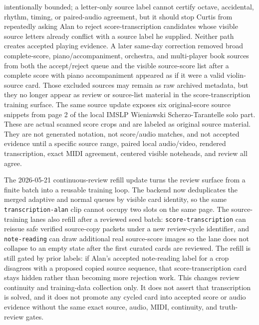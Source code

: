 \documentclass[12pt,letterpaper]{article}
\begin{document}
intentionally bounded; a letter-only source label cannot certify octave, accidental, rhythm, timing, or paired-audio agreement, but it should stop Curtis from repeatedly asking Alan to reject score-transcription candidates whose visible source letters already conflict with a source label he supplied. Neither path creates accepted playing evidence. A later same-day correction removed broad complete-score, piano/accompaniment, orchestra, and multi-player book sources from both the accept/reject queue and the visible source-score list after a complete score with piano accompaniment appeared as if it were a valid violin-source card. Those excluded sources may remain as raw archived metadata, but they no longer appear as review or source-list material in the score-transcription training surface. The same source update exposes six original-score source snippets from page 2 of the local IMSLP Wieniawski Scherzo-Tarantelle solo part. These are actual scanned score crops and are labeled as original source material. They are not generated notation, not score/audio matches, and not accepted evidence until a specific source range, paired local audio/video, rendered transcription, exact MIDI agreement, centered visible noteheads, and review all agree.

The 2026-05-21 continuous-review refill update turns the review surface from a finite batch into a reusable training loop. The backend now deduplicates the merged adaptive and normal queues by visible card identity, so the same \texttt{transcription-alan} clip cannot occupy two slots on the same page. The source-training lanes also refill after a reviewed seed batch: \texttt{score-transcription} can reissue safe verified source-copy packets under a new review-cycle identifier, and \texttt{note-reading} can draw additional real source-score images so the lane does not collapse to an empty state after the first curated cards are reviewed. The refill is still gated by prior labels: if Alan's accepted note-reading label for a crop disagrees with a proposed copied source sequence, that score-transcription card stays hidden rather than becoming more rejection work. This changes review continuity and training-data collection only. It does not assert that transcription is solved, and it does not promote any cycled card into accepted score or audio evidence without the same exact source, audio, MIDI, continuity, and truth-review gates.
\end{document}
